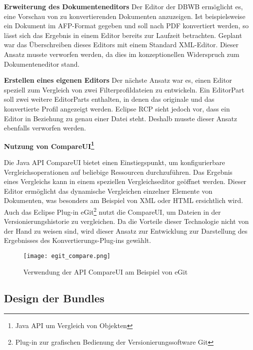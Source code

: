 {{{\textbf{Erweiterung des Dokumenteneditors}{
Der Editor der \ac{DBWB} ermöglicht es, eine Vorschau von zu konvertierenden Dokumenten anzuzeigen. Ist beispielsweise ein Dokument im \ac{AFP}-Format gegeben und soll nach \ac{PDF} konvertiert werden, so lässt sich das Ergebnis in einem Editor bereits zur Laufzeit betrachten. Geplant war das Überschreiben dieses Editors mit einem Standard XML-Editor. Dieser Ansatz musste verworfen werden, da dies im konzeptionellen Widerspruch zum Dokumenteneditor stand.
}

\textbf{Erstellen eines eigenen Editors}{
Der nächste Ansatz war es, einen Editor speziell zum Vergleich von zwei Filterprofildateien zu entwickeln. Ein EditorPart soll zwei weitere EditorParts enthalten, in denen das originale und das konvertierte Profil angezeigt werden. Eclipse \ac{RCP} sieht jedoch vor, dass ein Editor in Beziehung zu genau einer Datei steht. Deshalb musste dieser Ansatz ebenfalls verworfen werden. 
}

\textbf{Nutzung von CompareUI\footnote{Java \ac{API}
 um Vergleich von Objekten}}{Die Java \ac{API} CompareUI bietet einen Einstiegspunkt, um konfigurierbare Vergleichsoperationen auf beliebige Ressourcen durchzuführen. Das Ergebnis eines Vergleichs kann in einem speziellen Vergleichseditor geöffnet werden. Dieser Editor ermöglicht das dynamische Vergleichen einzelner Elemente von Dokumenten, was besonders am Beispiel von \ac{XML} oder \ac{HTML} ersichtlich wird. Auch das Eclipse Plug-in eGit\footnote{Plug-in zur grafischen Bedienung der Versionierungssoftware Git} nutzt die CompareUI, um Dateien in der Versionierungshistorie zu vergleichen. Da die Vorteile dieser Technologie nicht von der Hand zu weisen sind, wird dieser Ansatz zur Entwicklung zur Darstellung des Ergebnisses des Konvertierungs-Plug-ins gewählt.

\begin{figure}[htbp] 
  \centering
     \texttt{[image: egit\_compare.png]}
  \caption{Verwendung der API CompareUI am Beispiel von eGit}
\end{figure}

}



}

}






\subsection{Design der Bundles}{

}}

